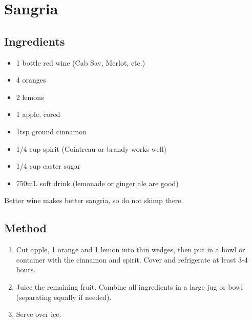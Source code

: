 \section{Sangria}

  
\subsection{Ingredients}

\begin{itemize}
    \item 1 bottle red wine (Cab Sav, Merlot, etc.)
    \item 4 oranges
    \item 2 lemons
    \item 1 apple, cored
    \item 1tsp ground cinnamon
    \item 1/4 cup spirit (Cointreau or brandy works well)
    \item 1/4 cup caster sugar
    \item 750mL soft drink (lemonade or ginger ale are good)
\end{itemize}

Better wine makes better sangria, so do not skimp there.

\subsection{Method}

\begin{enumerate}
    \item Cut apple, 1 orange and 1 lemon into thin wedges, then put in a bowl or container with the cinnamon and spirit. Cover and refrigerate at least 3-4 hours.
    \item Juice the remaining fruit. Combine all ingredients in a large jug or bowl (separating equally if needed).
    \item Serve over ice.
\end{enumerate}
